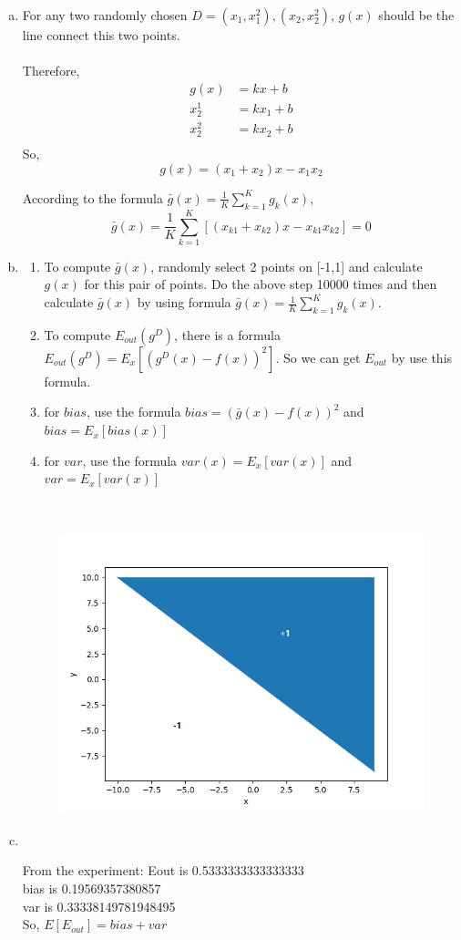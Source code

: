 \documentclass[11pt]{article}
\begin{document}
\begin{enumerate} [(a)]
	\item For any two randomly chosen $D={(x_1,x_1^2),(x_2,x_2^2)}$, $g(x)$ should be the line connect this two points.\\
	\\Therefore,\[
		\begin{aligned}
			g(x)&=kx+b\\
			x^1_2&=kx_1+b\\
			x^2_2&=kx_2+b\\
		\end{aligned}
	\]
	So,\[
		g(x)=(x_1+x_2)x-x_1x_2
	\]

	According to the formula $\bar{g}(x)=\frac{1}{K}\sum^K_{k=1}g_k(x)$,
	\[
		\bar{g}(x)=\frac{1}{K}\sum^K_{k=1}[(x_{k1}+x_{k2})x-x_{k1}x_{k2}]=0
	\]
	\item \begin{enumerate}[(1)]
		\item To compute $\bar{g}(x)$, randomly select 2 points on [-1,1] and calculate $g(x)$ for this pair of points. Do the above step 10000 times and then calculate $\bar{g}(x)$ by using formula $\bar{g}(x)=\frac{1}{K}\sum^K_{k=1}g_k(x)$.
		\item To compute $E_{out}(g^D)$, there is a formula $E_{out}(g^D)=E_x[(g^D(x)-f(x))^2]$. So we can get $E_{out}$ by use this formula.
		\item for $bias$, use the formula $bias=(\bar{g}(x)-f(x))^2$ and $bias=E_x[bias(x)]$
		\item for $var$, use the formula $var(x)=E_x[var(x)]$ and $var=E_x[var(x)]$
	\end{enumerate}
	
	

	\item 
	\begin{figure}[htb]
		{\includegraphics[height=10cm]{p2_15.png}}
	\end{figure}
	From the experiment:
	Eout is 0.5333333333333333\\
	bias is 0.19569357380857\\
	var is 0.33338149781948495\\
	So, $E[E_{out}]=bias+var$
	

\end{enumerate}
\end{document}
